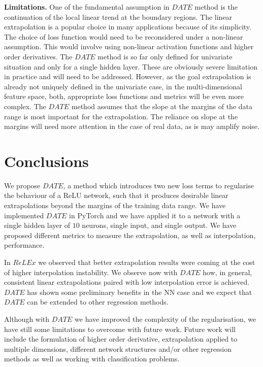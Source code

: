 \documentclass[runningheads]{llncs}
\begin{document}
\textbf{Limitations.}
One of the fundamental assumption in $DATE$ method is the continuation of the local linear trend at the boundary regions. 
The linear extrapolation is a popular choice in many applications because of its simplicity. 
The choice of loss function would need to be reconsidered under a non-linear assumption.
This would involve using non-linear activation functions and higher order derivatives. 
The $DATE$ method is so far only defined for univariate situation and only for a single hidden layer. 
These are obviously severe limitation in practice and will need to be addressed. 
However, as the goal extrapolation is already not uniquely defined in the univariate case, in the multi-dimensional feature space, both, appropriate loss functions and metrics will be even more complex. 
The $DATE$ method assumes that the slope at the margins of the data range is most important for the extrapolation. 
The reliance on slope at the margins will need more attention in the case of real data, as is may amplify noise. 


\section{Conclusions}

We propose $DATE$, a method which introduces two new loss terms to regularise the behaviour of a ReLU network, such that it produces desirable linear extrapolations beyond the margins of the training data range.
We have implemented $DATE$ in PyTorch and we have applied it to a network with a single hidden layer of $10$ neurons, single input, and single output. 
We have proposed different metrics to measure the extrapolation, as well as interpolation, performance.

In $ReLEx$ we observed that better extrapolation results were coming at the cost of higher interpolation instability.
We observe now with $DATE$ how, in general, consistent linear extrapolations paired with low interpolation error is achieved.
$DATE$ has shown some preliminary benefits in the NN case and we expect that $DATE$ can be extended to other regression methods.

Although with $DATE$ we have improved the complexity of the regularisation, we have still some limitations to overcome with future work.
Future work will include the formulation of higher order derivative, extrapolation applied to multiple dimensions, different network structures and/or other regression methods as well as working with classification problems.






\end{document}
